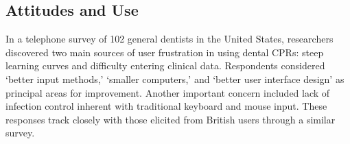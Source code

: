 \documentclass[11pt]{article}
\begin{document}
\subsection{Attitudes and Use}
In a telephone survey of 102 general dentists in the United States, researchers discovered two main sources of user frustration in using dental CPRs: steep learning curves and difficulty entering clinical data\cite{Schleyer2006Clinical-Comput}. Respondents considered `better input methods,' `smaller computers,' and `better user interface design' as principal areas for improvement. Another important concern included lack of infection control inherent with traditional keyboard and mouse input. These responses track closely with those elicited from British users through a similar survey\cite{John2003Questionnaire-s}.

\end{document}

